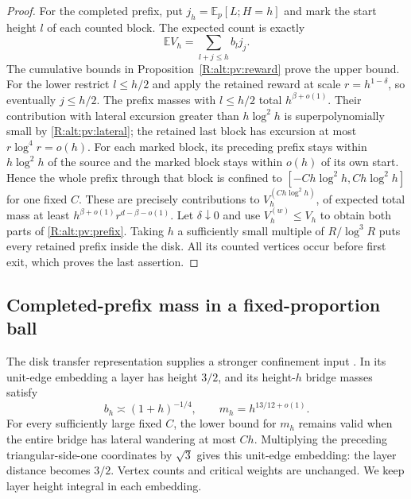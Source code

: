 \begin{proof}
For the completed prefix, put $j_h=\mathbb E_p[L;H=h]$ and mark the
start height $l$ of each counted block.  The expected count is exactly
\[
 \mathbb E V_h=\sum_{l+j\le h}b_l j_j.
\]
The cumulative bounds in Proposition~\ref{R:alt:pv:reward} prove the upper
bound.  For the lower restrict $l\le h/2$ and apply the retained reward
at scale $r=h^{1-\delta}$, so eventually $j\le h/2$.
The prefix masses with $l\le h/2$ total $h^{\beta+o(1)}$.
Their contribution with lateral excursion greater than $h\log^2h$ is
superpolynomially small by \eqref{R:alt:pv:lateral}; the retained last
block has excursion at most $r\log^4r=o(h)$.
For each marked block, its preceding prefix stays within $h\log^2h$ of
the source and the marked block stays within $o(h)$ of its own start.
Hence the whole prefix through that block is confined to
$[-C h\log^2h,C h\log^2h]$ for one fixed $C$. These are precisely
contributions to $V_h^{(C h\log^2h)}$, of expected total mass at least
$h^{\beta+o(1)}r^{d-\beta-o(1)}$. Let $\delta\downarrow0$ and use
$V_h^{(w)}\le V_h$ to obtain both parts of \eqref{R:alt:pv:prefix}.
Taking $h$ a sufficiently small multiple of $R/\log^3R$ puts every retained
prefix inside the disk. All its counted vertices occur before first exit,
which proves the last assertion.
\end{proof}

\subsection{Completed-prefix mass in a fixed-proportion ball}
\label{R:alt:pd}

The disk transfer representation supplies a stronger confinement input
\cite[Theorem~1.1]{RenewalDiskCompanion}.  In its unit-edge embedding a layer has height
$3/2$, and its height-$h$ bridge masses satisfy
\begin{equation}\label{R:alt:pd:input}
 b_h\asymp(1+h)^{-1/4},\qquad m_h=h^{13/12+o(1)}.
\end{equation}
For every sufficiently large fixed $C$, the lower bound for $m_h$ remains
valid when the entire bridge has lateral wandering at most $Ch$.
Multiplying the preceding triangular-side-one coordinates by $\sqrt3$
gives this unit-edge embedding: the layer distance becomes $3/2$.
Vertex counts and critical weights are unchanged.  We keep layer height integral
in each embedding.

